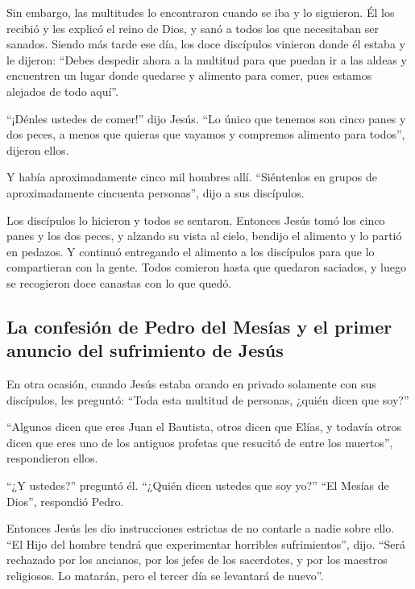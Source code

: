  Sin embargo, las multitudes lo encontraron cuando se iba
y lo siguieron. Él los recibió y les explicó el reino de Dios, y sanó a
todos los que necesitaban ser sanados.  Siendo más tarde
ese día, los doce discípulos vinieron donde él estaba y le dijeron:
``Debes despedir ahora a la multitud para que puedan ir a las aldeas y
encuentren un lugar donde quedarse y alimento para comer, pues estamos
alejados de todo aquí''.

 ``¡Dénles ustedes de comer!'' dijo Jesús. ``Lo único que
tenemos son cinco panes y dos peces, a menos que quieras que vayamos y
compremos alimento para todos'', dijeron ellos.

 Y había aproximadamente cinco mil hombres allí.
``Siéntenlos en grupos de aproximadamente cincuenta personas'', dijo a
sus discípulos.

 Los discípulos lo hicieron y todos se sentaron.
 Entonces Jesús tomó los cinco panes y los dos peces, y
alzando su vista al cielo, bendijo el alimento y lo partió en pedazos. Y
continuó entregando el alimento a los discípulos para que lo
compartieran con la gente.  Todos comieron hasta que
quedaron saciados, y luego se recogieron doce canastas con lo que quedó.

\hypertarget{la-confesiuxf3n-de-pedro-del-mesuxedas-y-el-primer-anuncio-del-sufrimiento-de-jesuxfas}{%
\subsection{La confesión de Pedro del Mesías y el primer anuncio del
sufrimiento de
Jesús}\label{la-confesiuxf3n-de-pedro-del-mesuxedas-y-el-primer-anuncio-del-sufrimiento-de-jesuxfas}}

 En otra ocasión, cuando Jesús estaba orando en privado
solamente con sus discípulos, les preguntó: ``Toda esta multitud de
personas, ¿quién dicen que soy?''

 ``Algunos dicen que eres Juan el Bautista, otros dicen
que Elías, y todavía otros dicen que eres uno de los antiguos profetas
que resucitó de entre los muertos'', respondieron ellos.

 ``¿Y ustedes?'' preguntó él. ``¿Quién dicen ustedes que
soy yo?'' ``El Mesías de Dios'', respondió Pedro.

 Entonces Jesús les dio instrucciones estrictas de no
contarle a nadie sobre ello.  ``El Hijo del hombre tendrá
que experimentar horribles sufrimientos'', dijo. ``Será rechazado por
los ancianos, por los jefes de los sacerdotes, y por los maestros
religiosos. Lo matarán, pero el tercer día se levantará de nuevo''.

